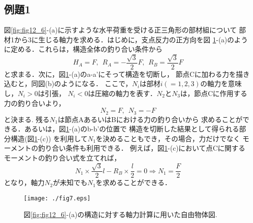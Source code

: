 ﻿\documentclass[10pt,a4j]{jbook}
\begin{document}
\subsection{例題1}
図\ref{fig:fig12_6}-(a)に示すような水平荷重を受ける正三角形の部材組について
部材1から3に生じる軸力を求める．はじめに，支点反力の正方向を図
\ref{fig:fig12_7}-(a)のように定める．これらは，構造全体の釣り合い条件から
\begin{equation}
	H_A=F, \ \ 
	R_A=-\frac{\sqrt{3}}{2}F, \ \ 
	R_B= \frac{\sqrt{3}}{2}F
\end{equation}
と求まる．次に，図\ref{fig:fig12_7}-(a)のa-a'にそって構造を切断し，
節点Cに加わる力を描き込むと，同図(b)のようになる．
ここで，$N_i$は部材$i(=1,2,3)$の軸力を意味し，$N_i>0$は引張，
$N_i<0$は圧縮の軸力を表す．$N_2$と$N_3$は，節点Cに作用する力の釣り合いより，
\begin{equation}
	N_2=F, \ \ N_3=-F
\end{equation}
と決まる.  残る$N_1$は節点AあるいはBにおける力の釣り合いから
求めることができる．あるいは，図\ref{fig:fig12_7}-(a)のb-b'の位置で
構造を切断した結果として得られる部分構造(図\ref{fig:fig12_7}-(c))
を利用して$N_1$を決めることもでき，その場合，力だけでなく
モーメントの釣り合い条件も利用できる．
例えば，図\ref{fig:fig12_7}-(c)において点Cに関するモーメントの釣り合い式を立てれば，
\begin{equation}
	N_1\times \frac{\sqrt{3}}{2}l -R_B\times \frac{l}{2}=0 \Rightarrow
	N_1=\frac{F}{2}
\end{equation}
となり，軸力$N_2$が未知でも$N_1$を求めることができる．
\begin{figure}[h]
	\begin{center}
	\texttt{[image: ./fig7.eps]} 
	\end{center}
	\caption{
		図\ref{fig:fig12_6}-(a)の構造に対する軸力計算に用いた自由物体図.
	} 
	\label{fig:fig12_7}
\end{figure}
\end{document}
